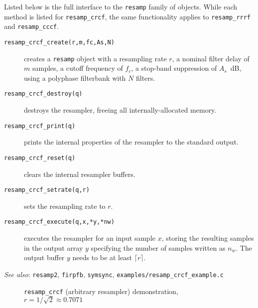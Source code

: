 Listed below is the full interface to the {\tt resamp} family of
objects.
While each method is listed for {\tt resamp\_crcf}, the same
functionality applies to {\tt resamp\_rrrf} and {\tt resamp\_cccf}.
%
\begin{description}
\item[{\tt resamp\_crcf\_create(r,m,fc,As,N)}]
    creates a {\tt resamp} object with a resampling rate $r$,
    a nominal filter delay of $m$ samples, a cutoff frequency of $f_c$,
    a stop-band suppression of $A_s$~dB, using a polyphase filterbank
    with $N$ filters.
\item[{\tt resamp\_crcf\_destroy(q)}]
    destroys the resampler, freeing all internally-allocated memory.
\item[{\tt resamp\_crcf\_print(q)}]
    prints the internal properties of the resampler to the standard
    output.
\item[{\tt resamp\_crcf\_reset(q)}]
    clears the internal resampler buffers.
\item[{\tt resamp\_crcf\_setrate(q,r)}]
    sets the resampling rate to $r$.
\item[{\tt resamp\_crcf\_execute(q,x,*y,*nw)}]
    executes the resampler for an input sample $x$,
    storing the resulting samples in the output array $y$
    specifying the number of samples written as $n_w$.
    The output buffer $y$ needs to be at least $\lceil r \rceil$.
\end{description}
%
{\em See also}: {\tt resamp2}, {\tt firpfb}, {\tt symsync},
{\tt examples/resamp\_crcf\_example.c}

\begin{figure}
\centering
{}
\caption{
    {\tt resamp\_crcf} (arbitrary resampler) demonstration,
    $r = 1/\sqrt{2} \approx 0.7071$}
\label{fig:module:filter:resamp_crcf}
\end{figure}


% 
%
